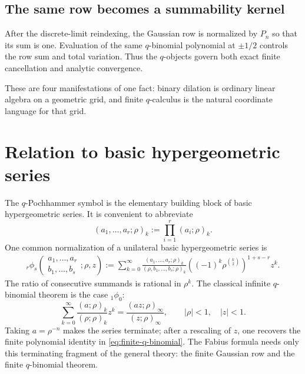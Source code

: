 \documentclass[11pt]{article}
\theoremstyle{definition}
\newcommand{\qpoch}[3]{\left(#1;#2\right)_{#3}}
\begin{document}
\subsection{The same row becomes a summability kernel}

After the discrete-limit reindexing, the Gaussian row is normalized by $P_n$ so that its sum is one.  Evaluation of the same $q$-binomial polynomial at $\pm1/2$ controls the row sum and total variation.  Thus the $q$-objects govern both exact finite cancellation and analytic convergence.

These are four manifestations of one fact: binary dilation is ordinary linear algebra on a geometric grid, and finite $q$-calculus is the natural coordinate language for that grid.

\section{Relation to basic hypergeometric series}
\label{sec:basic-hypergeometric}

The $q$-Pochhammer symbol is the elementary building block of basic hypergeometric series.  It is convenient to abbreviate
\begin{equation}
  (a_1,\ldots,a_r;\rho)_k
  :=\prod_{i=1}^{r}\qpoch{a_i}{\rho}{k}.
  \label{eq:multiple-qpoch}
\end{equation}
One common normalization of a unilateral basic hypergeometric series is
\begin{align}
 {}_r\phi_s\!\left(
   \begin{matrix}a_1,\ldots,a_r\\ b_1,\ldots,b_s\end{matrix}
   ;\rho,z\right)
  :=\sum_{k=0}^{\infty}
  \frac{(a_1,\ldots,a_r;\rho)_k}
       {(\rho,b_1,\ldots,b_s;\rho)_k}
  \left((-1)^k\rho^{\binom{k}{2}}\right)^{1+s-r}z^k.
  \label{eq-basic-hypergeometric-definition}
\end{align}
The ratio of consecutive summands is rational in $\rho^k$.  The classical infinite $q$-binomial theorem is the case ${}_1\phi_0$:
\begin{equation}
  \sum_{k=0}^{\infty}
    \frac{\qpoch{a}{\rho}{k}}{\qpoch{\rho}{\rho}{k}}z^k
  =\frac{\qpoch{az}{\rho}{\infty}}
         {\qpoch{z}{\rho}{\infty}},
  \qquad |\rho|<1,\quad |z|<1.
  \label{eq:infinite-q-binomial}
\end{equation}
Taking $a=\rho^{-n}$ makes the series terminate; after a rescaling of $z$, one recovers the finite polynomial identity in \cref{eq:finite-q-binomial}.  The Fabius formula needs only this terminating fragment of the general theory: the finite Gaussian row and the finite $q$-binomial theorem.
\end{document}
